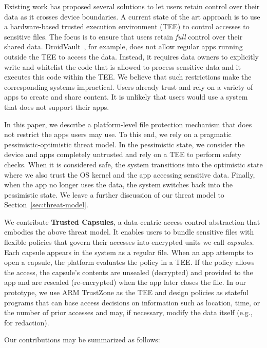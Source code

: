   Existing work has proposed several solutions to let users retain
  control over their data as it crosses device boundaries. A current
  state of the art approach is to use a hardware-based trusted
  execution environment (TEE) to control accesses to sensitive files.
  The focus is to ensure that users retain {\em full} control over their
  shared data. DroidVault~\cite{li14droidvault}, for example, does not
  allow regular apps running outside the TEE to access the
  data. Instead, it requires data owners to explicitly write and
  whitelist the code that is allowed to process sensitive data and it
  executes this code within the TEE. We believe that such restrictions
  make the corresponding systems impractical. Users already trust and
  rely on a variety of apps to create and share content. It is unlikely
  that users would use a system that does not support their apps.
  
  In this paper, we describe a platform-level file protection mechanism
  that does not restrict the apps users may use. To this end, we rely on
  a pragmatic pessimistic-optimistic threat model. In the pessimistic
  state, we consider the device and apps completely untrusted and rely
  on a TEE to perform safety checks. When it is considered safe, the
  system transitions into the optimistic state where we also trust the
  OS kernel and the app accessing sensitive data. Finally, when the app
  no longer uses the data, the system switches back into the
  pessimistic state. We leave a further discussion of our threat model
  to Section~\ref{sec:threat-model}.
  
  We contribute {\bf Trusted Capsules}, a data-centric access control abstraction that
  embodies the above threat model. It enables users to bundle sensitive files with
  flexible policies that govern their accesses into encrypted units we call {\em
    capsules}. Each capsule appears in the system as a regular file. When an app
  attempts to open a capsule, the platform evaluates the policy in a TEE. If the
  policy allows the access, the capsule's contents are unsealed (decrypted) and
  provided to the app and are resealed (re-encrypted) when the app later closes
  the file. In our prototype, we use ARM TrustZone as the TEE and design policies
  as stateful programs that can base access decisions on information such as
  location, time, or the number of prior accesses and may, if necessary, modify
  the data itself (e.g., for redaction).

  Our contributions may be summarized as follows:

